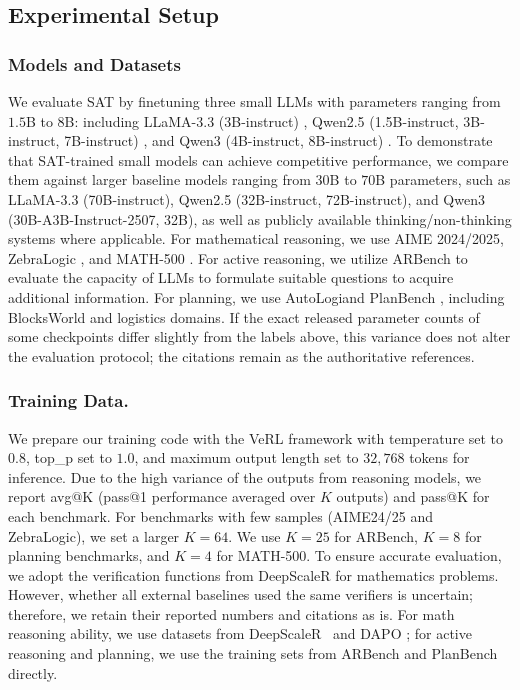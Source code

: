 \documentclass[sigconf]{aamas}
\begin{document}
\subsection{Experimental Setup}
\label{sec:exp-setup}

\subsubsection{Models and Datasets}
We evaluate SAT by finetuning three small LLMs with parameters ranging from $1.5$B to $8$B: including LLaMA-3.3 (3B-instruct) \citep{dubey2024llama}, Qwen2.5 (1.5B-instruct, 3B-instruct, 7B-instruct) \citep{qwen2025qwen25technicalreport}, and Qwen3 (4B-instruct, 8B-instruct) \citep{yang2025qwen3technicalreport}. To demonstrate that SAT-trained small models can achieve competitive performance, we compare them against larger baseline models ranging from $30$B to $70$B parameters, such as LLaMA-3.3 (70B-instruct), Qwen2.5 (32B-instruct, 72B-instruct), and Qwen3 (30B-A3B-Instruct-2507, 32B), as well as publicly available thinking/non-thinking systems where applicable. For mathematical reasoning, we use AIME 2024/2025\citep{aime2024}, ZebraLogic \citep{lin2025zebralogic}, and MATH-500 \citep{hendrycks2021math}. For active reasoning, we utilize ARBench \citep{zhou2025passive} to evaluate the capacity of LLMs to formulate suitable questions to acquire additional information. For planning, we use AutoLogi\citep{zhu2025autologiautomatedgenerationlogic}and PlanBench \citep{valmeekam2024planbench}, including BlocksWorld and logistics domains. If the exact released parameter counts of some checkpoints differ slightly from the labels above, this variance does not alter the evaluation protocol; the citations remain as the authoritative references.

\subsubsection{Training Data.}
We prepare our training code with the VeRL framework \citep{sheng2024hybridflow} with temperature set to $0.8$, top\_p set to $1.0$, and maximum output length set to $32{,}768$ tokens for inference. Due to the high variance of the outputs from reasoning models, we report avg@K (pass@1 performance averaged over $K$ outputs) and pass@K for each benchmark. For benchmarks with few samples (AIME24/25 and ZebraLogic), we set a larger $K=64$. We use $K=25$ for ARBench, $K=8$ for planning benchmarks, and $K=4$ for MATH-500. To ensure accurate evaluation, we adopt the verification functions from DeepScaleR for mathematics problems. However, whether all external baselines used the same verifiers is uncertain; therefore, we retain their reported numbers and citations as is. For math reasoning ability, we use datasets from DeepScaleR~\citep{luo2025deepcoder} and DAPO \citep{yu2025dapo}; for active reasoning and planning, we use the training sets from ARBench and PlanBench directly. 
\end{document}
